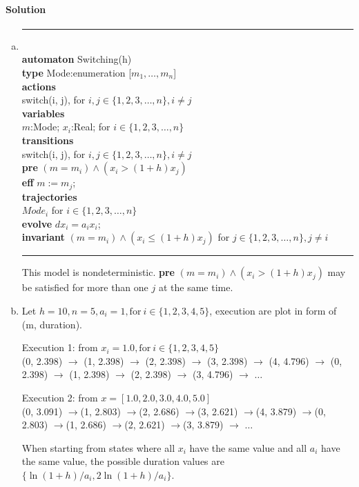 \documentclass[11pt]{article}
\newcommand{\tab}{\hspace*{5mm}}
\begin{document}
\paragraph{Solution}
\begin{enumerate}[(a)]
\item
\noindent\rule{7cm}{1.0pt}\\
\textbf{automaton} Switching(h)\\
\tab\textbf{type} Mode:enumeration [$m_1, \ldots, m_n$]\\
\tab\textbf{actions}\\
\tab\tab switch(i, j), for $i,j \in \{1,2,3,\ldots,n\}, i \neq j$\\
\tab\textbf{variables}\\
\tab\tab $m$:Mode; $x_i$:Real; for $i \in \{1,2,3,\ldots,n\}$\\
\tab\textbf{transitions}\\
\tab\tab switch(i, j), for $i,j \in \{1,2,3,\ldots,n\}, i \neq j$\\
\tab\tab \textbf{pre} $(m = m_i) \wedge (x_i > (1+h)x_j)$\\
\tab\tab \textbf{eff} $m := m_j$;\\
\tab\textbf{trajectories}\\
\tab\tab $Mode_i$ for $i \in \{1,2,3,\ldots,n\}$\\
\tab\tab \textbf{evolve} $dx_i = a_i x_i$;\\
\tab\tab \textbf{invariant} $(m = m_i) \wedge (x_i \leq (1+h)x_j)$ for $j \in \{1,2,3,\ldots,n\}, j \neq i$\\

\noindent\rule{7cm}{1.0pt}

This model is nondeterministic. \textbf{pre} $(m = m_i) \wedge (x_i > (1+h)x_j)$ may be satisfied for more than one $j$ at the same time.

\item
Let $h=10, n=5, a_i = 1, \text{for}~i \in \{1,2,3,4,5\}$, execution are plot in form of (m, duration).

Execution 1: from $x_i = 1.0, \text{for}~i \in \{1,2,3,4,5\}$\\
(0, 2.398) $\rightarrow$ (1, 2.398) $\rightarrow$ (2, 2.398) $\rightarrow$ (3, 2.398) $\rightarrow$ (4, 4.796) $\rightarrow$ (0, 2.398) $\rightarrow$ (1, 2.398) $\rightarrow$ (2, 2.398) $\rightarrow$ (3, 4.796) $\rightarrow$ $\ldots$

Execution 2: from $x = [1.0, 2.0, 3.0, 4.0, 5.0]$\\
(0, 3.091) $\rightarrow$(1, 2.803) $\rightarrow$(2, 2.686) $\rightarrow$(3, 2.621) $\rightarrow$(4, 3.879) $\rightarrow$(0, 2.803) $\rightarrow$(1, 2.686) $\rightarrow$(2, 2.621) $\rightarrow$(3, 3.879) $\rightarrow$ $\ldots$

When starting from states where all $x_i$ have the same value and all $a_i$ have the same value, the possible duration values are $\{\ln(1+h)/a_i, 2\ln(1+h)/a_i\}$.
\end{enumerate}
\end{document}
